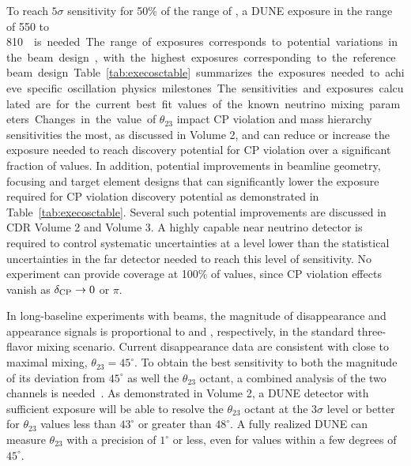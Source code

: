 %
To reach $5\sigma$ sensitivity for 50\% of the range of \deltacp, a
DUNE exposure in the range of \num{550} to \SI{810}\ktMWyr{}  is needed. The
range of exposures corresponds to potential variations in the beam
design, with the highest exposures corresponding to the reference beam
design. Table~\ref{tab:execosctable} summarizes the exposures needed to
achieve specific oscillation physics milestones.  The sensitivities
and exposures calculated are for the current best fit values of the
known neutrino mixing parameters. Changes in the value of
$\theta_{23}$ impact CP violation and mass hierarchy sensitivities the
most, as discussed in Volume 2, and can reduce or increase the exposure
needed to reach discovery potential for CP violation over a
significant fraction of \deltacp values. In addition, potential
improvements in beamline geometry, focusing and target element designs
that can significantly lower the exposure required for CP violation
discovery potential as demonstrated in Table~\ref{tab:execosctable}. Several such potential improvements are discussed
in CDR Volume 2 and Volume 3. A highly capable near neutrino detector
is required to control systematic uncertainties at a level lower than
the statistical uncertainties in the far detector needed to reach this
level of sensitivity.  No experiment can provide coverage at 100\% of
\deltacp values, since CP violation effects vanish as $\mdeltacp\to 0$
or $\pi$.
  
In long-baseline experiments with \numu beams, the
magnitude of \numu disappearance and \nue appearance signals is
proportional to  and ,
respectively, in the standard three-flavor mixing scenario.  Current
\numu disappearance data are consistent with close to maximal
mixing, $\theta_{23} = 45^\circ$.  To obtain the best sensitivity to
both the magnitude of its deviation from $45^\circ$ as well the 
$\theta_{23}$ octant, a combined analysis of the two channels
is needed~\cite{Huber:2010dx}.  As demonstrated in Volume 2, a
 DUNE detector with sufficient exposure will be able to
resolve the $\theta_{23}$ octant at the $3\sigma$ level or better for
$\theta_{23}$ values less than $43^\circ$ or greater than $48^\circ$.
A fully realized DUNE can measure $\theta_{23}$ with a precision of
$1^\circ$ or less, even for values within a few degrees of
$45^\circ$. 

